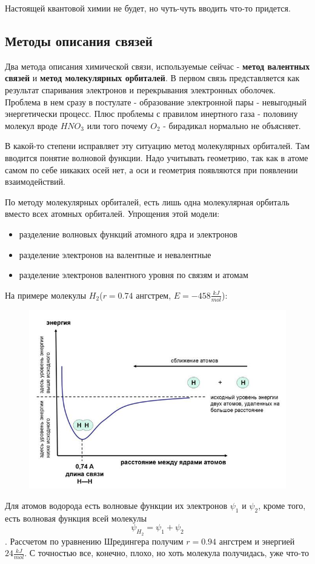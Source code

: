 \documentclass[11pt]{article}
\begin{document}
Настоящей квантовой химии не будет, но чуть-чуть вводить что-то придется. 
\subsection*{Методы описания связей}
Два метода описания химической связи, используемые сейчас - \textbf{метод валентных связей} и \textbf{метод молекулярных орбиталей}.
В первом связь представляется как результат спаривания электронов и перекрывания электронных оболочек. Проблема в нем сразу в постулате - образование электронной пары - невыгодный энергетически процесс. Плюс проблемы с правилом инертного газа - половину молекул вроде $HNO_3$ или того почему $O_2$ - бирадикал нормально не объясняет.

В какой-то степени исправляет эту ситуацию метод молекулярных орбиталей. Там вводится понятие волновой функции. Надо учитывать геометрию, так как в атоме самом по себе никаких осей нет, а оси и геометрия появляются при появлении взаимодействий.

По методу молекулярных орбиталей, есть лишь одна молекулярная орбиталь вместо всех атомных орбиталей. Упрощения этой модели: 
\begin{itemize}
\item разделение волновых функций атомного ядра и электронов
\item разделение электронов на валентные и невалентные
\item разделение электронов валентного уровня по связям и атомам
\end{itemize}

На примере молекулы $H_2$($r=0.74$ ангстрем, $E = -458 \frac{kJ}{mol}$):
\begin{figure}[htp]
\centering
\includegraphics[scale=2.00]{h2-er.png}
\end{figure}
Для атомов водорода есть волновые функции их электронов $\psi_1$ и $\psi_2$, кроме того, есть волновая функция всей молекулы $$\psi_{H_2} = \psi_1 + \psi_2$$. Рассчетом по уравнению Шредингера получим $r=0.94$ ангстрем и энергией $24 \frac{kJ}{mol}$. С точностью все, конечно, плохо, но хоть молекула получидась, уже что-то
\end{document}

